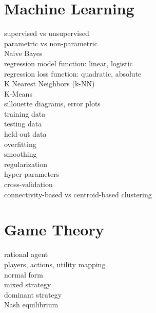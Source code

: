 \documentclass[a4paper]{article}
\begin{document}
\begin{multicols*}{2}
\vfill\null
\columnbreak

\section{Machine Learning}
supervised vs unsupervised \\
parametric vs non-parametric \\
Naive Bayes\\
regression model function: linear, logistic\\
regression loss function: quadratic, absolute\\
K Nearest Neighbors (k-NN) \\
K-Means \\
sillouette diagrams, error plots \\
training data \\
testing data \\
held-out data \\
overfitting\\
smoothing \\
regularization\\
hyper-parameters \\
cross-validation\\
connectivity-based vs centroid-based clustering\\

\section{Game Theory}
rational agent\\
players, actions, utility mapping\\
normal form\\
mixed strategy\\
dominant strategy\\
Nash equilibrium\\





\end{multicols*}
\end{document}
